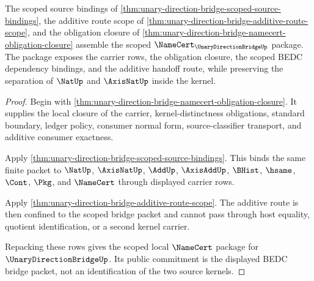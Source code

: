 \begin{theorem}
\label{thm:unary-direction-bridge-namecert-scoped-package}
The scoped source bindings of \autoref{thm:unary-direction-bridge-scoped-source-bindings}, the additive route scope of \autoref{thm:unary-direction-bridge-additive-route-scope}, and the obligation closure of \autoref{thm:unary-direction-bridge-namecert-obligation-closure} assemble the scoped $\NameCert_{\UnaryDirectionBridgeUp}$ package. The package exposes the carrier rows, the obligation closure, the scoped BEDC dependency bindings, and the additive handoff route, while preserving the separation of $\NatUp$ and $\AxisNatUp$ inside the kernel.
\end{theorem}
\begin{proof}
Begin with \autoref{thm:unary-direction-bridge-namecert-obligation-closure}. It supplies the local closure of the carrier, kernel-distinctness obligations, standard boundary, ledger policy, consumer normal form, source-classifier transport, and additive consumer exactness.

Apply \autoref{thm:unary-direction-bridge-scoped-source-bindings}. This binds the same finite packet to $\NatUp$, $\AxisNatUp$, $\AddUp$, $\AxisAddUp$, $\BHist$, $\hsame$, $\Cont$, $\Pkg$, and $\NameCert$ through displayed carrier rows.

Apply \autoref{thm:unary-direction-bridge-additive-route-scope}. The additive route is then confined to the scoped bridge packet and cannot pass through host equality, quotient identification, or a second kernel carrier.

Repacking these rows gives the scoped local $\NameCert$ package for $\UnaryDirectionBridgeUp$. Its public commitment is the displayed BEDC bridge packet, not an identification of the two source kernels.
\end{proof}

